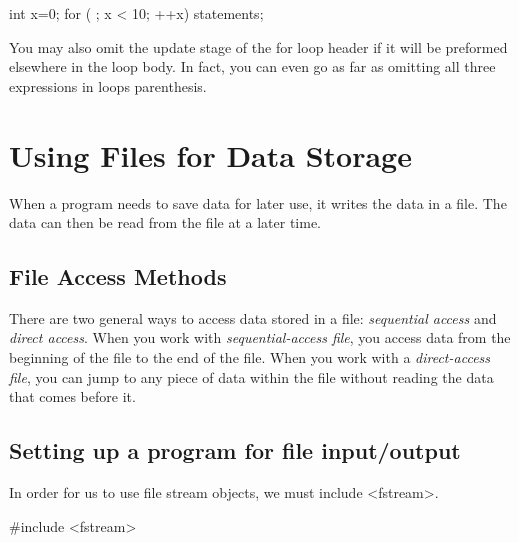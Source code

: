 \documentclass{report}
\begin{document}
    \begin{cppcode}
int x=0;
for ( ; x < 10; ++x) {
    statements;
}

    \end{cppcode}
    
    \bigbreak \noindent 
    You may also omit the update stage of the for loop header if it will be preformed elsewhere in the loop body. In fact, you can even go as far as omitting all three expressions in loops parenthesis.

    \pagebreak \bigbreak \noindent 
    \section{\LARGE Using Files for Data Storage}
    \bigbreak \noindent 
    \begin{concept}
 When a program needs to save data for later use, it writes the data in a file. The data can then be read from the file at a later time.
	\end{concept}
    \bigbreak \noindent 
    \subsection{File Access Methods}
    \bigbreak \noindent 
    There are two general ways to access data stored in a file: \textit{sequential access} and \textit{direct access}. When you work with \textit{sequential-access file}, you access data from the beginning of the file to the end of the file.
    \bigbreak \noindent 
    When you work with a \textit{direct-access file}, you can jump to any piece  of data within the file without reading the data that comes before it.
    \bigbreak \noindent 
    \subsection{Setting up a program for file input/output}
    \bigbreak \noindent 
    In order for us to use file stream objects, we must include <fstream>.
    \bigbreak \noindent 
    
    \begin{cppcode}
#include <fstream>
    \end{cppcode}
    
    \bigbreak \noindent 
\end{document}

